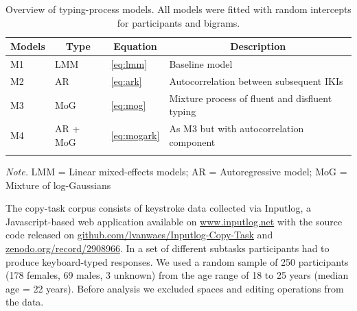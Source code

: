 \documentclass[
  english,
  man,mask,floatsintext]{apa7}
\begin{document}
\begin{table}[bp!]

\begin{center}
\begin{threeparttable}

\caption{\label{tab:models}Overview of typing-process models. All models were fitted with random intercepts for participants and bigrams.}

\begin{tabular}{llll}
\toprule
Models & \multicolumn{1}{c}{Type} & \multicolumn{1}{c}{Equation} & \multicolumn{1}{c}{Description}\\
\midrule
M1 & LMM & \ref{eq:lmm} & Baseline model\\
M2 & AR & \ref{eq:ark} & Autocorrelation between subsequent IKIs\\
M3 & MoG & \ref{eq:mog} & Mixture process of fluent and disfluent typing\\
M4 & AR + MoG & \ref{eq:mogark} & As M3 but with autocorrelation component\\
\bottomrule
\addlinespace
\end{tabular}

\begin{tablenotes}[para]
\normalsize{\textit{Note.} LMM = Linear mixed-effects models; AR = Autoregressive model; MoG = Mixture of log-Gaussians}
\end{tablenotes}

\end{threeparttable}
\end{center}

\end{table}

The copy-task corpus consists of keystroke data collected via Inputlog, a Javascript-based web application available on \url{www.inputlog.net} with the source code released on \href{https://github.com/lvanwaes/Inputlog-Copy-Task}{github.com/lvanwaes/Inputlog-Copy-Task} and \href{https://zenodo.org/record/2908966}{zenodo.org/record/2908966}. In a set of different subtasks participants had to produce keyboard-typed responses. We used a random sample of 250 participants (178 females, 69 males, 3 unknown) from the age range of 18 to 25 years (median age = 22 years). Before analysis we excluded spaces and editing operations from the data.
\end{document}
